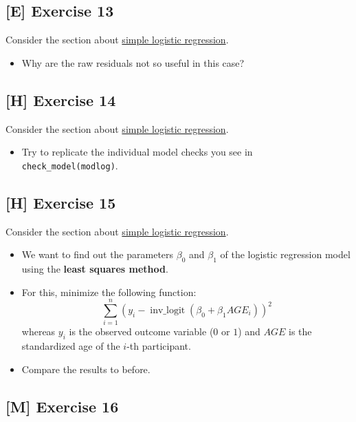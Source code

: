 \documentclass[
]{book}
\providecommand{\tightlist}{%
  \setlength{\itemsep}{0pt}\setlength{\parskip}{0pt}}
\begin{document}
\subsection{{[}E{]} Exercise 13}\label{exercise13_LMM}

Consider the section about \hyperref[simple_logistic_regression]{simple logistic regression}.

\begin{itemize}
\tightlist
\item
  Why are the raw residuals not so useful in this case?
\end{itemize}

\subsection{{[}H{]} Exercise 14}\label{exercise14_LMM}

Consider the section about \hyperref[simple_logistic_regression]{simple logistic regression}.

\begin{itemize}
\tightlist
\item
  Try to replicate the individual model checks you see in \texttt{check\_model(modlog)}.
\end{itemize}

\subsection{{[}H{]} Exercise 15}\label{exercise15_LMM}

Consider the section about \hyperref[simple_logistic_regression]{simple logistic regression}.

\begin{itemize}
\tightlist
\item
  We want to find out the parameters \(\beta_0\) and \(\beta_1\) of the logistic regression model
  using the \textbf{least squares method}.
\item
  For this, minimize the following function:
  \[\sum_{i=1}^n (y_i - \operatorname{inv\_logit}(\beta_0 + \beta_1 AGE_i))^2\]
  whereas \(y_i\) is the observed outcome variable (\(0\) or \(1\)) and
  \(AGE\) is the standardized age of the \(i\)-th participant.
\item
  Compare the results to before.
\end{itemize}

\subsection{{[}M{]} Exercise 16}\label{exercise16_LMM}
\end{document}
